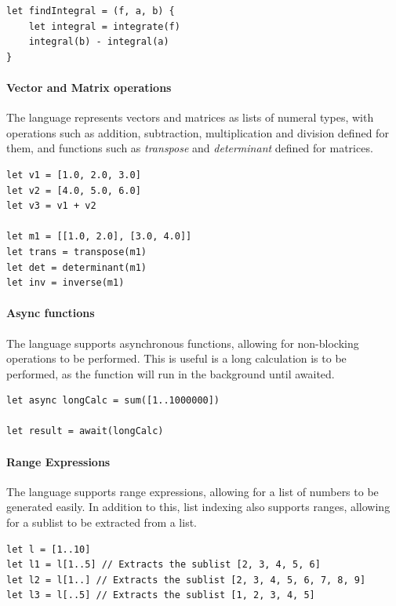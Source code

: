 \begin{verbatim}
let findIntegral = (f, a, b) {
    let integral = integrate(f)
    integral(b) - integral(a)
}
\end{verbatim}

\paragraph{Vector and Matrix operations} The language represents vectors and matrices as lists of numeral types, with
operations such as addition, subtraction, multiplication and division defined for them, and functions such as \textit{transpose} and \textit{determinant} defined for matrices.

\begin{verbatim}
let v1 = [1.0, 2.0, 3.0]
let v2 = [4.0, 5.0, 6.0]
let v3 = v1 + v2

let m1 = [[1.0, 2.0], [3.0, 4.0]]
let trans = transpose(m1)
let det = determinant(m1)
let inv = inverse(m1)
\end{verbatim}


\paragraph{Async functions} The language supports asynchronous functions, allowing for non-blocking operations
to be performed.
This is useful is a long calculation is to be performed, as the function will run in the background until awaited.

\begin{verbatim}
let async longCalc = sum([1..1000000])

let result = await(longCalc)
\end{verbatim}

\paragraph{Range Expressions} The language supports range expressions, allowing for a list of numbers to be
generated easily.
In addition to this, list indexing also supports ranges, allowing for a sublist to be extracted from a list.

\begin{verbatim}
let l = [1..10]
let l1 = l[1..5] // Extracts the sublist [2, 3, 4, 5, 6]
let l2 = l[1..] // Extracts the sublist [2, 3, 4, 5, 6, 7, 8, 9]
let l3 = l[..5] // Extracts the sublist [1, 2, 3, 4, 5]
\end{verbatim}


